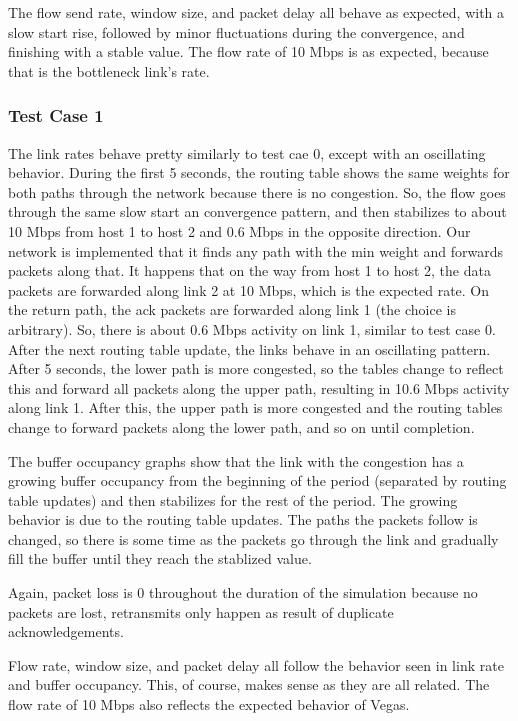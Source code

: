 The flow send rate, window size, and packet delay all behave as expected,
with a slow start rise, followed by minor fluctuations during the convergence,
and finishing with a stable value. The flow rate of 10 Mbps is as expected,
because that is the bottleneck link's rate.

\subsubsection{Test Case 1}
The link rates behave pretty similarly to test cae 0, except with an
oscillating behavior. During the first 5 seconds, the routing table shows the
same weights for both paths through the network because there is no congestion.
So, the flow goes through the same slow start an convergence pattern, and then
stabilizes to about 10 Mbps from host 1 to host 2 and 0.6 Mbps in the opposite
direction.
Our network is implemented that it finds any path with the min weight and
forwards packets along that. It happens that on the way from host 1 to host 2,
the data packets are forwarded along link 2 at 10 Mbps, which is the expected
rate. On the return path, the ack packets are forwarded along link 1 (the
choice is arbitrary). So, there is about 0.6 Mbps activity on link 1, similar
to test case 0. After the next routing table update, the links behave in
an oscillating pattern. After 5 seconds, the lower path is more congested,
so the tables change to reflect this and forward all packets along the upper
path, resulting in 10.6 Mbps activity along link 1. After this, the upper
path is more congested and the routing tables change to forward packets
along the lower path, and so on until completion.

The buffer occupancy graphs show that the link with the congestion has
a growing buffer occupancy from the beginning of the period
(separated by routing table updates) and then stabilizes for the rest of the
period. The growing behavior is due to the routing table updates. The paths
the packets follow is changed, so there is some time as the packets go through
the link and gradually fill the buffer until they reach the stablized value.

Again, packet loss is 0 throughout the duration of the simulation because no
packets are lost, retransmits only happen as result of duplicate
acknowledgements.

Flow rate, window size, and packet delay all follow the behavior seen in
link rate and buffer occupancy.
This, of course, makes sense as they are all related. The flow
rate of 10 Mbps also reflects the expected behavior of Vegas.

